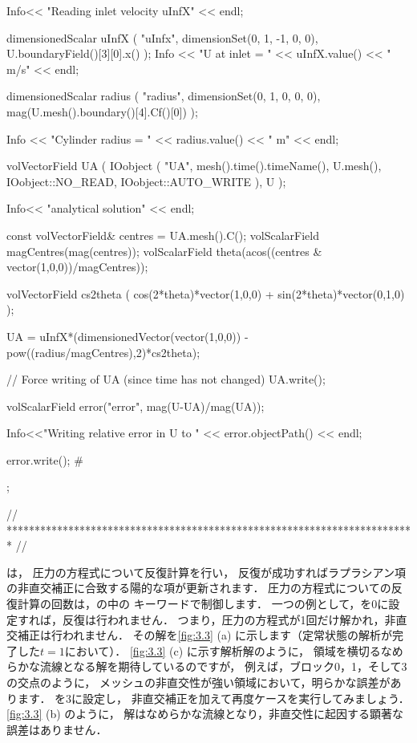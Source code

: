 \begin{OFverbatim}
{{{            Info<< "Reading inlet velocity  uInfX\n" << endl;

            dimensionedScalar uInfX
            (
                "uInfx",
                dimensionSet(0, 1, -1, 0, 0),
                U.boundaryField()[3][0].x()
            );
            Info << "U at inlet = " << uInfX.value() << " m/s" << endl;

            dimensionedScalar radius
            (
                "radius",
                dimensionSet(0, 1, 0, 0, 0),
                mag(U.mesh().boundary()[4].Cf()[0])
            );

            Info << "Cylinder radius = " << radius.value() << " m" << endl;

            volVectorField UA
            (
                IOobject
                (
                    "UA",
                    mesh().time().timeName(),
                    U.mesh(),
                    IOobject::NO_READ,
                    IOobject::AUTO_WRITE
                ),
                U
            );

            Info<< "\nEvaluating analytical solution" << endl;

            const volVectorField& centres = UA.mesh().C();
            volScalarField magCentres(mag(centres));
            volScalarField theta(acos((centres & vector(1,0,0))/magCentres));

            volVectorField cs2theta
            (
                cos(2*theta)*vector(1,0,0)
              + sin(2*theta)*vector(0,1,0)
            );

            UA = uInfX*(dimensionedVector(vector(1,0,0))
              - pow((radius/magCentres),2)*cs2theta);

            // Force writing of UA (since time has not changed)
            UA.write();

            volScalarField error("error", mag(U-UA)/mag(UA));

            Info<<"Writing relative error in U to " << error.objectPath()
                << endl;

            error.write();
        #};
    }
}


// ************************************************************************* //
\end{OFverbatim}
は，
圧力の方程式について反復計算を行い，
反復が成功すればラプラシアン項の非直交補正に合致する陽的な項が更新されます．
圧力の方程式についての反復計算の回数は，の中の
キーワードで制御します．
一つの例として，を0に設定すれば，反復は行われません．
つまり，圧力の方程式が1回だけ解かれ，非直交補正は行われません．
その解を\autoref{fig:3.3} (a) に示します（定常状態の解析が完了した$t = 1$において）．
\autoref{fig:3.3} (c) に示す解析解のように，
領域を横切るなめらかな流線となる解を期待しているのですが，
例えば，ブロック0，1，そして3の交点のように，
メッシュの非直交性が強い領域において，明らかな誤差があります．
を3に設定し，
非直交補正を加えて再度ケースを実行してみましょう．
\autoref{fig:3.3} (b) のように，
解はなめらかな流線となり，非直交性に起因する顕著な誤差はありません．



